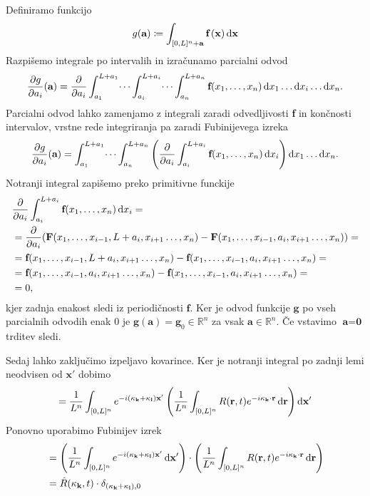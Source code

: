 \documentclass[mat2, tisk]{fmfdelo}
\newcommand{\R}{\mathbb R}
\newcommand{\bd}{\textbf}
\begin{document}
\begin{dokaz}
Definiramo funkcijo 
$$
g(\bd{a}) \coloneqq \int_{[0, L]^n + \bd{a}}\bd{f}\,(\bd{x}) \dif\bd{x} 
$$
Razpišemo integrale po intervalih in izračunamo parcialni odvod
\begin{align*}
\frac{\partial g}{\partial a_i}(\bd{a}) = \frac{\partial}{\partial a_i} \int_{a_1}^{L + a_1} \dots \int_{a_i}^{L + a_i} \dots \int_{a_n}^{L + a_n} \bd{f}(x_1, \dots, x_n) \dif x_1 \dots \dif x_i \dots  \dif x_n.
\end{align*}
Parcialni odvod lahko zamenjamo z integrali zaradi odvedljivosti \bd{f} in končnosti 
intervalov, vrstne rede integriranja pa zaradi Fubinijevega izreka 
\begin{align*}
  \frac{\partial g}{\partial a_i}(\bd{a}) = \int_{a_1}^{L + a_1} \dots \int_{a_n}^{L + a_n} \left(\frac{\partial}{\partial a_i} \int_{a_i}^{L + a_i} \bd{f}(x_1, \dots, x_n) \dif x_i \right) \dif x_1 \dots \dif x_n.
\end{align*}
Notranji integral zapišemo preko primitivne funckije 
\begin{align*}
&\frac{\partial}{\partial a_i} \int_{a_i}^{L + a_i} \bd{f}(x_1, \dots, x_n) \dif x_i = \\
&= \frac{\partial}{\partial a_i} (\bd{F}(x_1, \dots, x_{i-1}, L + a_i, x_{i+1} \dots, x_n) - \bd{F}(x_1, \dots, x_{i-1},  a_i, x_{i+1} \dots, x_n)) = \\
&= \bd{f}(x_1, \dots, x_{i-1}, L + a_i, x_{i+1} \dots, x_n) - \bd{f}(x_1, \dots, x_{i-1},  a_i, x_{i+1} \dots, x_n) = \\
&= \bd{f}(x_1, \dots, x_{i-1}, a_i, x_{i+1} \dots, x_n) - \bd{f}(x_1, \dots, x_{i-1},  a_i, x_{i+1} \dots, x_n) = \\
&= 0,
\end{align*}
kjer zadnja enakost sledi iz periodičnosti $\bd{f}$. Ker je odvod funkcije 
$\bd{g}$ po vseh parcialnih odvodih enak $0$ je $\bd{g}(\bd{a}) = \bd{g}_0 \in \R^n$  
za vsak $\bd{a} \in \R^n$. Če vstavimo $\bd{a} = \bd{0}$ trditev sledi.
\end{dokaz}
Sedaj lahko zaključimo izpeljavo kovarince. Ker je notranji integral po zadnji lemi neodvisen 
od $\bd{x}'$ dobimo 
$$
= \frac{1}{L^{n}} \int_{[0, L]^{n}} e^{-i(\bd{\text{$\kappa$}}_{\bd{k}} + \bd{\text{$\kappa$}}_{\bd{l}})\bd{x}'}\left(\frac{1}{L^n}\int_{[0, L]^{n}} R(\bd{r}, t) e^{-i\bd{\text{$\kappa$}}_{\bd{k}} \cdot \bd{r}} \dif\bd{r}\right) \dif\bd{x}'
$$
Ponovno uporabimo Fubinijev izrek 
\begin{align*}
&= \left(\frac{1}{L^{n}} \int_{[0, L]^{n}} e^{-i(\bd{\text{$\kappa$}}_{\bd{k}} + \bd{\text{$\kappa$}}_{\bd{l}})\bd{x}'} \dif\bd{x}' \right) \cdot\left(\frac{1}{L^n}\int_{[0, L]^{n}} R(\bd{r}, t) e^{-i\bd{\text{$\kappa$}}_{\bd{k}} \cdot \bd{r}} \dif\bd{r}\right) \\
&= \hat{R}(\text{\bd{$\kappa$}}_{\bd{k}}, t) \cdot \delta_{(\bd{\text{$\kappa$}}_{\bd{k}} + \bd{\text{$\kappa$}}_{\bd{l}}), 0}
\end{align*}
\end{document}
